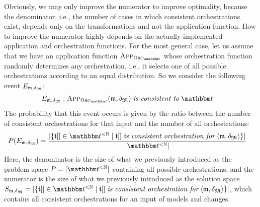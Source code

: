 Obviously, we may only improve the numerator to improve optimality, because the denominator, i.e., the number of cases in which consistent orchestrations exist, depends only on the transformations and not the application function.
How to improve the numerator highly depends on the actually implemented application and orchestration functions.
For the most general case, let us assume that we have an application function $\appfunction{\orcfunction{\transformationset{T}}}$ whose orchestration function randomly determines any orchestration, i.e., it selects one of all possible orchestrations according to an equal distribution.
So we consider the following event $E_{\modeltuple{m},\changetuple{\metamodeltuple{M}}}$:
\begin{align*}
    &
    E_{\modeltuple{m},\changetuple{\metamodeltuple{M}}}: \appfunction{\orcfunction{\transformationset{T}}}(\modeltuple{m}, \changetuple{\metamodeltuple{M}}) \mathtextspacearound{is consistent to} \transformationset{T}
\end{align*}
The probability that this event occurs is given by the ratio between the number of consistent orchestrations for that input and the number of all orchestrations:
\begin{align*}
    &
    P(E_{\modeltuple{m},\changetuple{\metamodeltuple{M}}}) = \frac{
        \abs{\setted{\sequence{\transformation{t}} \in \transformationset{T}^{< \mathbb{N}} \mid \sequence{\transformation{t}} \mathtextspacearound{is consistent orchestration for} \tupled{\modeltuple{m}, \changetuple{\metamodeltuple{M}}}}}
    }{
        \abs{\transformationset{T}^{< \mathbb{N}}}
    }
\end{align*}
Here, the denominator is the size of what we previously introduced as the problem space $P = \abs{\transformationset{T}^{< \mathbb{N}}}$ containing all possible orchestrations, and the numerator is the size of what we previously introduced as the solution space $S_{\modeltuple{m}, \changetuple{\metamodeltuple{M}}} = \abs{\setted{\sequence{\transformation{t}} \in \transformationset{T}^{< \mathbb{N}} \mid \sequence{\transformation{t}} \mathtextspacearound{is consistent orchestration for} \tupled{\modeltuple{m}, \changetuple{\metamodeltuple{M}}}}}$, which contains all consistent orchestrations for an input of models and changes.

